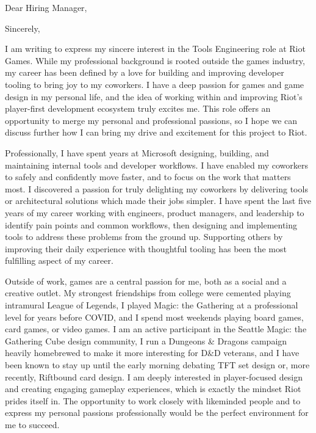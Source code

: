 \documentclass[10pt,a4paper,sans]{moderncv}
\begin{document}
\date{\today}
\opening{Dear Hiring Manager,}
\closing{Sincerely,}

\makelettertitle

I am writing to express my sincere interest in the Tools Engineering role at Riot Games. While my professional background is rooted outside the games industry, my career has been defined by a love for building and improving developer tooling to bring joy to my coworkers.  I have a deep passion for games and game design in my personal life, and the idea of working within and improving Riot's player-first development ecosystem truly excites me.  This role offers an opportunity to merge my personal and professional passions, so I hope we can discuss further how I can bring my drive and excitement for this project to Riot.

Professionally, I have spent years at Microsoft designing, building, and maintaining internal tools and developer workflows.  I have enabled my coworkers to safely and confidently move faster, and to focus on the work that matters most. I discovered a passion for truly delighting my coworkers by delivering tools or architectural solutions which made their jobs simpler.  I have spent the last five years of my career working with engineers, product managers, and leadership to identify pain points and common workflows, then designing and implementing tools to address these problems from the ground up.  Supporting others by improving their daily experience with thoughtful tooling has been the most fulfilling aspect of my career.  

Outside of work, games are a central passion for me, both as a social and a creative outlet. My strongest friendships from college were cemented playing intramural League of Legends, I played Magic: the Gathering at a professional level for years before COVID, and I spend most weekends playing board games, card games, or video games. I am an active participant in the Seattle Magic: the Gathering Cube design community, I run a Dungeons \& Dragons campaign heavily homebrewed to make it more interesting for D\&D veterans, and I have been known to stay up until the early morning debating TFT set design or, more recently, Riftbound card design.  I am deeply interested in player-focused design and creating engaging gameplay experiences, which is exactly the mindset Riot prides itself in. The opportunity to work closely with likeminded people and to express my personal passions professionally would be the perfect environment for me to succeed.
\end{document}
